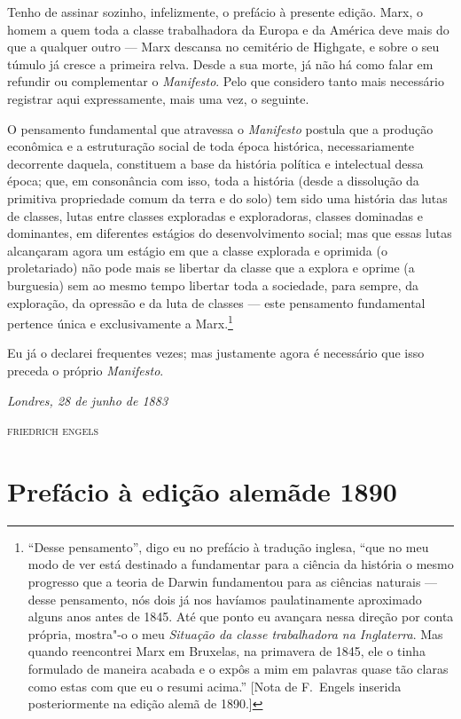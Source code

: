Tenho de assinar sozinho, infelizmente, o prefácio à presente edição.
Marx, o homem a quem toda a classe trabalhadora da Europa e da América
deve mais do que a qualquer outro  ---  Marx descansa no cemitério de
Highgate, e sobre o seu túmulo já cresce a primeira relva. Desde a sua
morte, já não há como falar em refundir ou complementar o
\textit{Manifesto}. Pelo que considero tanto mais necessário registrar
aqui expressamente, mais uma vez, o seguinte.

O pensamento fundamental que atravessa o
\textit{Manifesto} postula que a produção econômica e
a estruturação social de toda época histórica, necessariamente
decorrente daquela, constituem a base da história política e
intelectual dessa época; que, em consonância com isso, toda a história
(desde a dissolução da primitiva propriedade comum da terra e do solo)
tem sido uma história das lutas de classes, lutas entre classes
exploradas e exploradoras, classes dominadas e dominantes, em
diferentes estágios do desenvolvimento social; mas que essas lutas
alcançaram agora um estágio em que a classe explorada e oprimida (o
proletariado) não pode mais se libertar da classe que a explora e
oprime (a burguesia) sem ao mesmo tempo libertar toda a sociedade, para
sempre, da exploração, da opressão e da luta de classes --- este
pensamento fundamental pertence única e exclusivamente a
Marx.\footnote{ “Desse pensamento”, digo eu no prefácio à tradução inglesa, 
“que no meu modo de ver está destinado a fundamentar para a ciência da 
história o mesmo progresso que a teoria de Darwin fundamentou para as 
ciências naturais  ---  desse pensamento, nós dois já nos havíamos paulatinamente 
aproximado alguns anos antes de 1845. Até que ponto eu avançara nessa direção 
por conta própria, mostra"-o o meu \textit{Situação da classe
trabalhadora na Inglaterra}. Mas quando reencontrei Marx em Bruxelas,
na primavera de 1845, ele o tinha formulado de maneira acabada e o
expôs a mim em palavras quase tão claras como estas com que eu o resumi
acima.” [Nota de F.~Engels inserida posteriormente na edição alemã de
1890.]}

Eu já o declarei frequentes vezes; mas justamente agora é necessário que
isso preceda o próprio \mbox{\textit{Manifesto}}.
\bigskip

\hfill \textit{Londres, 28 de junho de 1883}

\hfill \textsc{friedrich engels}

\chapter[Prefácio à edição alemã de 1890]{Prefácio à edição alemã\break de 1890}

